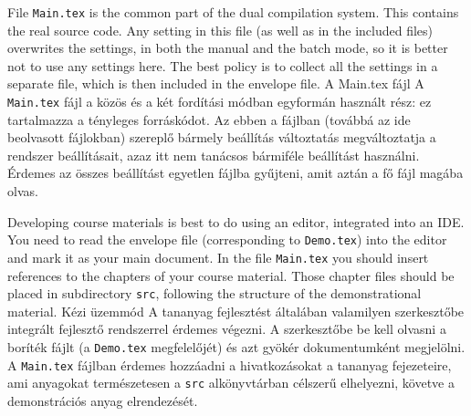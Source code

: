 

\label{sec:compiling}





{
File \lstinline|Main.tex| is the common part of the dual compilation system. 
This contains the real source code. Any setting in this file (as well as in the included files)
overwrites the settings, in both the manual and the batch mode, so it is better
not to use any settings here. The best policy is to collect all the settings
in a separate file, which is then included in the envelope file.
}
{A Main.tex fájl}
{
A \lstinline|Main.tex| fájl a közös és a két fordítási módban egyformán használt rész:
ez tartalmazza a tényleges forráskódot. Az ebben a fájlban (továbbá az ide beolvasott fájlokban)
szereplő bármely beállítás változtatás megváltoztatja a rendszer beállításait,
azaz itt nem tanácsos bármiféle beállítást használni. Érdemes az összes beállítást 
egyetlen fájlba gyűjteni, amit aztán a fő fájl magába olvas.
}


{
Developing course materials is best to do using an editor, integrated into an IDE.
You need to read the envelope file (corresponding to \lstinline|Demo.tex|) into the
editor and mark it as your main document. 
In the file \lstinline|Main.tex| you should insert references to the chapters of your course material.
Those chapter files should be placed in subdirectory \lstinline|src|, following the structure of 
the demonstrational material.
}
{Kézi üzemmód}
{
A tananyag fejlesztést általában valamilyen szerkesztőbe integrált fejlesztő rendszerrel
érdemes végezni. A szerkesztőbe be kell olvasni a boríték fájlt (a \lstinline|Demo.tex| megfelelőjét)
és azt gyökér dokumentumként megjelölni.
A \lstinline|Main.tex| fájlban érdemes hozzáadni a hivatkozásokat a tananyag fejezeteire, ami anyagokat
természetesen a \lstinline|src| alkönyvtárban célszerű elhelyezni, követve a demonstrációs anyag elrendezését.
}

